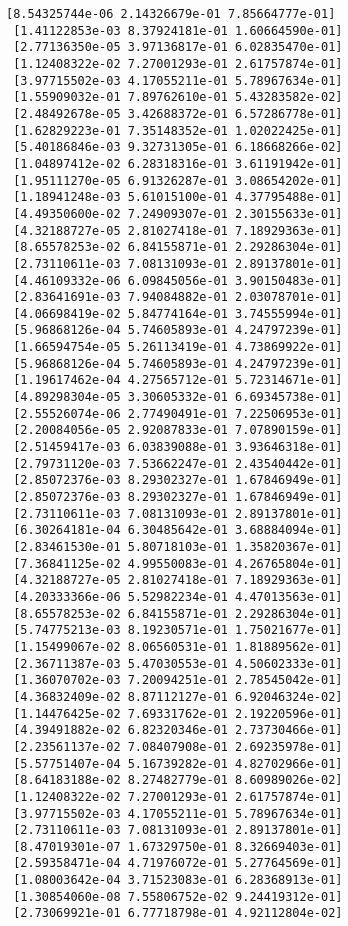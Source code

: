 \documentclass[11pt]{article}
\begin{document}
\begin{Verbatim}[commandchars=\\\{\}]
 [8.54325744e-06 2.14326679e-01 7.85664777e-01]
 [1.41122853e-03 8.37924181e-01 1.60664590e-01]
 [2.77136350e-05 3.97136817e-01 6.02835470e-01]
 [1.12408322e-02 7.27001293e-01 2.61757874e-01]
 [3.97715502e-03 4.17055211e-01 5.78967634e-01]
 [1.55909032e-01 7.89762610e-01 5.43283582e-02]
 [2.48492678e-05 3.42688372e-01 6.57286778e-01]
 [1.62829223e-01 7.35148352e-01 1.02022425e-01]
 [5.40186846e-03 9.32731305e-01 6.18668266e-02]
 [1.04897412e-02 6.28318316e-01 3.61191942e-01]
 [1.95111270e-05 6.91326287e-01 3.08654202e-01]
 [1.18941248e-03 5.61015100e-01 4.37795488e-01]
 [4.49350600e-02 7.24909307e-01 2.30155633e-01]
 [4.32188727e-05 2.81027418e-01 7.18929363e-01]
 [8.65578253e-02 6.84155871e-01 2.29286304e-01]
 [2.73110611e-03 7.08131093e-01 2.89137801e-01]
 [4.46109332e-06 6.09845056e-01 3.90150483e-01]
 [2.83641691e-03 7.94084882e-01 2.03078701e-01]
 [4.06698419e-02 5.84774164e-01 3.74555994e-01]
 [5.96868126e-04 5.74605893e-01 4.24797239e-01]
 [1.66594754e-05 5.26113419e-01 4.73869922e-01]
 [5.96868126e-04 5.74605893e-01 4.24797239e-01]
 [1.19617462e-04 4.27565712e-01 5.72314671e-01]
 [4.89298304e-05 3.30605332e-01 6.69345738e-01]
 [2.55526074e-06 2.77490491e-01 7.22506953e-01]
 [2.20084056e-05 2.92087833e-01 7.07890159e-01]
 [2.51459417e-03 6.03839088e-01 3.93646318e-01]
 [2.79731120e-03 7.53662247e-01 2.43540442e-01]
 [2.85072376e-03 8.29302327e-01 1.67846949e-01]
 [2.85072376e-03 8.29302327e-01 1.67846949e-01]
 [2.73110611e-03 7.08131093e-01 2.89137801e-01]
 [6.30264181e-04 6.30485642e-01 3.68884094e-01]
 [2.83461530e-01 5.80718103e-01 1.35820367e-01]
 [7.36841125e-02 4.99550083e-01 4.26765804e-01]
 [4.32188727e-05 2.81027418e-01 7.18929363e-01]
 [4.20333366e-06 5.52982234e-01 4.47013563e-01]
 [8.65578253e-02 6.84155871e-01 2.29286304e-01]
 [5.74775213e-03 8.19230571e-01 1.75021677e-01]
 [1.15499067e-02 8.06560531e-01 1.81889562e-01]
 [2.36711387e-03 5.47030553e-01 4.50602333e-01]
 [1.36070702e-03 7.20094251e-01 2.78545042e-01]
 [4.36832409e-02 8.87112127e-01 6.92046324e-02]
 [1.14476425e-02 7.69331762e-01 2.19220596e-01]
 [4.39491882e-02 6.82320346e-01 2.73730466e-01]
 [2.23561137e-02 7.08407908e-01 2.69235978e-01]
 [5.57751407e-04 5.16739282e-01 4.82702966e-01]
 [8.64183188e-02 8.27482779e-01 8.60989026e-02]
 [1.12408322e-02 7.27001293e-01 2.61757874e-01]
 [3.97715502e-03 4.17055211e-01 5.78967634e-01]
 [2.73110611e-03 7.08131093e-01 2.89137801e-01]
 [8.47019301e-07 1.67329750e-01 8.32669403e-01]
 [2.59358471e-04 4.71976072e-01 5.27764569e-01]
 [1.08003642e-04 3.71523083e-01 6.28368913e-01]
 [1.30854060e-08 7.55806752e-02 9.24419312e-01]
 [2.73069921e-01 6.77718798e-01 4.92112804e-02]

\end{Verbatim}
\end{document}
